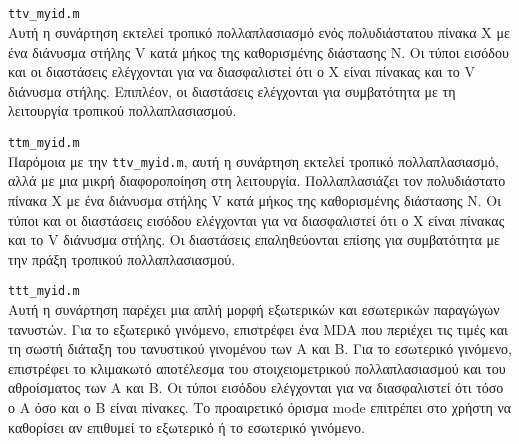 \documentclass[12pt,a4paper]{article}
\begin{document}
\subsection{}
  \texttt{ttv\_myid.m}\\

Αυτή η συνάρτηση εκτελεί τροπικό πολλαπλασιασμό ενός πολυδιάστατου πίνακα X με ένα διάνυσμα στήλης V  κατά μήκος της καθορισμένης διάστασης N. Οι τύποι εισόδου και οι διαστάσεις ελέγχονται για να διασφαλιστεί ότι ο  X  είναι πίνακας και το V  διάνυσμα στήλης. Επιπλέον, οι διαστάσεις ελέγχονται για συμβατότητα με τη λειτουργία τροπικού πολλαπλασιασμού.\\

\texttt{ttm\_myid.m} \\

Παρόμοια με την \texttt{ttv\_myid.m}, αυτή η συνάρτηση εκτελεί τροπικό πολλαπλασιασμό, αλλά με μια μικρή διαφοροποίηση στη λειτουργία. Πολλαπλασιάζει τον πολυδιάστατο πίνακα X  με ένα διάνυσμα στήλης V κατά μήκος της καθορισμένης διάστασης N. Οι τύποι και οι διαστάσεις εισόδου ελέγχονται για να διασφαλιστεί ότι ο X είναι πίνακας και το V διάνυσμα στήλης. Οι διαστάσεις επαληθεύονται επίσης για συμβατότητα με την πράξη τροπικού πολλαπλασιασμού.\\

\texttt{ttt\_myid.m} \\

Αυτή η συνάρτηση παρέχει μια απλή μορφή εξωτερικών και εσωτερικών παραγώγων τανυστών. Για το εξωτερικό γινόμενο, επιστρέφει ένα  MDA που περιέχει τις τιμές και τη σωστή διάταξη του τανυστικού γινομένου των A και B. Για το εσωτερικό γινόμενο, επιστρέφει το κλιμακωτό αποτέλεσμα του στοιχειομετρικού πολλαπλασιασμού και του αθροίσματος των A και B. Οι τύποι εισόδου ελέγχονται για να διασφαλιστεί ότι τόσο ο A όσο και ο B είναι πίνακες. Το προαιρετικό όρισμα mode επιτρέπει στο χρήστη να καθορίσει αν επιθυμεί το εξωτερικό ή το εσωτερικό γινόμενο.\\
\end{document}
